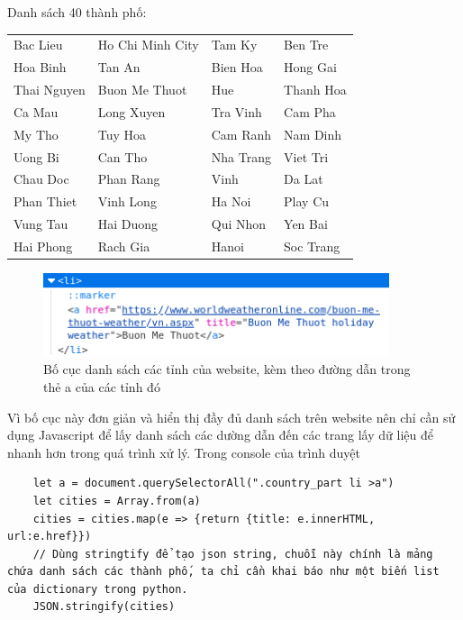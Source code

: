 \documentclass{article}
\begin{document}
Danh sách 40 thành phố:
\begin{table}[H]
	\begin{tabular}{llll}
		Bac Lieu    & Ho Chi Minh City & Tam Ky    & Ben Tre   \\
		Hoa Binh    & Tan An           & Bien Hoa  & Hong Gai  \\
		Thai Nguyen & Buon Me Thuot    & Hue       & Thanh Hoa \\
		Ca Mau      & Long Xuyen       & Tra Vinh  & Cam Pha   \\
		My Tho      & Tuy Hoa          & Cam Ranh  & Nam Dinh  \\
		Uong Bi     & Can Tho          & Nha Trang & Viet Tri  \\
		Chau Doc    & Phan Rang        & Vinh      & Da Lat    \\
		Phan Thiet  & Vinh Long        & Ha Noi    & Play Cu   \\
		Vung Tau    & Hai Duong        & Qui Nhon  & Yen Bai   \\
		Hai Phong   & Rach Gia         & Hanoi     & Soc Trang \\
	\end{tabular}
\end{table}

\begin{figure}[H]
	\centering
	\includegraphics[width=4in]{images/html_structure.png}
	\caption{
		Bố cục danh sách các tỉnh của website, kèm theo đường dẫn trong thẻ a của các tỉnh đó}
\end{figure}

Vì bố cục này đơn giản và hiển thị đầy đủ danh sách trên website nên chỉ cần sử dụng Javascript để lấy danh sách các dường dẫn đến các trang lấy dữ liệu để nhanh hơn trong quá trình xử lý. Trong console của trình duyệt

\begin{verbatim}
	let a = document.querySelectorAll(".country_part li >a")
	let cities = Array.from(a)
	cities = cities.map(e => {return {title: e.innerHTML, url:e.href}})
	// Dùng stringtify để tạo json string, chuỗi này chính là mảng chứa danh sách các thành phố, ta chỉ cần khai báo như một biến list của dictionary trong python.
	JSON.stringify(cities)
\end{verbatim}
\end{document}
